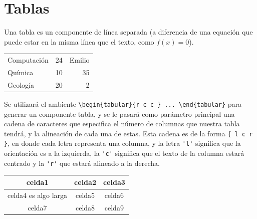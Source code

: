 \documentclass[12pt,letterpaper,oneside]{article}
\begin{document}
\section*{Tablas}

\noindent Una tabla es un componente de línea separada (a diferencia de una equación que puede estar en la misma línea que el texto, como $f(x)=0$).

\begin{center}
\begin{tabular}{ l c r }
 Computación & 24 & Emilio \\ 
 Química & 10 & 35 \\ 
 Geología & 20 & 2 \\ 
\end{tabular}
\end{center}


Se utilizará el ambiente \verb|\begin{tabular}{r c c } ... \end{tabular}| para generar un componente tabla, y se le pasará como parámetro principal una cadena de caracteres que especifica el número de columnas que nuestra tabla tendrá, y la alineación de cada una de estas. Esta cadena es de la forma \verb|{ l c r }|, en donde cada letra representa una columna, y la letra \verb|'l'| significa que la orientación es a la izquierda, la \verb|'c'| significa que el texto de la columna estará centrado y la \verb|'r'| que estará alineado a la derecha.

\begin{center} %
\begin{tabular}{ |c|c|c| } 
 \hline %
 celda1 & celda2 & celda3 \\ 
 \hline 
 celda4 es algo larga & celda5 & celda6 \\ 
 \hline 
 celda7 & celda8 & celda9 \\ 
 \hline %
\end{tabular}
\end{center}
\end{document}
